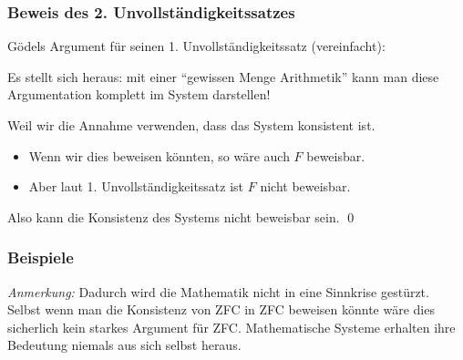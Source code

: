 \documentclass[aspectratio=1610,onlymath]{beamer}
\begin{document}
\begin{frame}\frametitle{Beweis des 2. Unvollständigkeitssatzes}

\alert{Gödels Argument für seinen 1. Unvollständigkeitssatz (vereinfacht):}

Es stellt sich heraus: mit einer "`gewissen Menge Arithmetik"' kann man diese Argumentation komplett im System darstellen!\medskip\pause

\pause\bigskip

\alert{Weil wir die Annahme verwenden, dass das System konsistent ist.}
\begin{itemize}
\item Wenn wir dies beweisen könnten, so wäre auch $F$ beweisbar.
\item Aber laut 1. Unvollständigkeitssatz ist $F$ nicht beweisbar.
\end{itemize}
Also kann die Konsistenz des Systems nicht beweisbar sein. \qed

\end{frame}

\begin{frame}\frametitle{Beispiele}

\bigskip\pause

\bigskip\pause

\emph{Anmerkung:} Dadurch wird die Mathematik nicht in eine Sinnkrise gestürzt. Selbst wenn
man die Konsistenz von ZFC in ZFC beweisen könnte wäre dies sicherlich kein starkes Argument für ZFC. Mathematische Systeme erhalten ihre Bedeutung niemals aus sich selbst heraus.

\end{frame}
\end{document}
